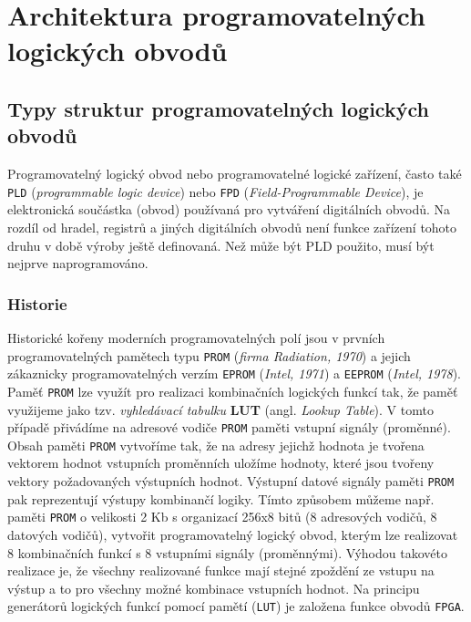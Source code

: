 \chapter{Architektura programovatelných logických obvodů}
\minitoc

  \section{Typy struktur programovatelných logic\-kých obvodů}
    Programovatelný logický obvod nebo programovatelné logické zařízení, často také \texttt{PLD}
    (\emph{programmable logic device}) nebo \texttt{FPD} (\emph{Field-Programmable Device}), je
    elektronická součástka (obvod) používaná pro vytváření digitálních obvodů. Na rozdíl od hradel,
    registrů a jiných digitálních obvodů není funkce zařízení tohoto druhu v době výroby ještě
    definovaná. Než může být PLD použito, musí být nejprve naprogramováno.
    
    \subsection{Historie}
      Historické kořeny moderních programovatelných polí jsou v prvních progra\-mo\-va\-tel\-ných
      pamětech typu \texttt{PROM} (\emph{firma Radiation, 1970}) a jejich zákaznicky
      programovatelných verzím \texttt{EPROM} (\emph{Intel, 1971}) a \texttt{EEPROM} (\emph{Intel,
      1978}). Paměť \texttt{PROM} lze využít pro realizaci kombinačních logických funkcí tak, že
      paměť využijeme jako tzv. \emph{vyhledávací tabulku} \textbf{LUT} (angl. \emph{Lookup
      Table}). V tomto případě přivádíme na adresové vodiče \texttt{PROM} paměti vstupní signály
      (proměnné). Obsah paměti \texttt{PROM} vytvoříme tak, že na adresy jejichž hodnota je tvořena
      vektorem hodnot vstupních proměnních uložíme hodnoty, které jsou tvořeny vektory požadovaných
      výstupních hodnot. Výstupní datové signály paměti \texttt{PROM} pak reprezentují výstupy
      kombinančí logiky. Tímto způsobem můžeme např. paměti \texttt{PROM} o velikosti 2 Kb s
      organizací 256x8 bitů (8 adresových vodičů, 8 datových vodičů), vytvořit programovatelný
      logický obvod, kterým lze realizovat 8 kombinačních funkcí s 8 vstupními signály
      (proměnnými). Výhodou takovéto realizace je, že všechny realizované funkce mají stejné
      zpoždění ze vstupu na výstup a to pro všechny možné kombinace vstupních hodnot. Na principu
      generátorů logických funkcí pomocí pamětí (\texttt{LUT}) je založena funkce obvodů
      \texttt{FPGA}.
      
